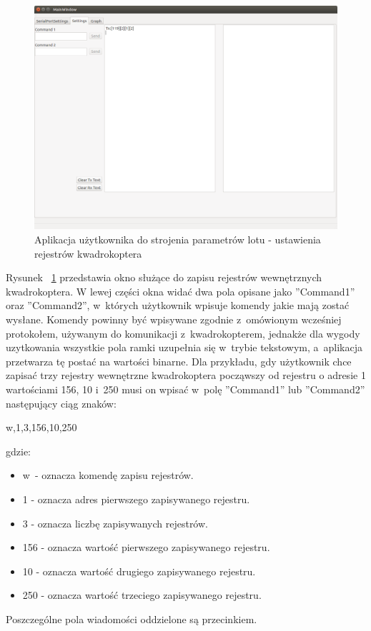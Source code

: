 \documentclass[11pt, twoside]{Thesis} %
\begin{document}
\begin{figure}[H]
	\centering
	\includegraphics[scale=0.4]{Pictures/QuadroTune/QuadroTuneSettings.png}
	\caption[Aplikacja użytkownika do strojenia parametrów lotu - ustawienia rejestrów kwadrokoptera]{Aplikacja użytkownika do strojenia parametrów lotu - ustawienia rejestrów kwadrokoptera}
	\label{fig:QuadroTune_screen2}
\end{figure}

Rysunek ~\ref{fig:QuadroTune_screen2} przedstawia okno służące do zapisu rejestrów wewnętrznych kwadrokoptera. W lewej części okna widać dwa pola opisane jako ''Command1'' oraz ''Command2'', w~których użytkownik wpisuje komendy jakie mają zostać wysłane. Komendy powinny być wpisywane zgodnie z~omówionym wcześniej protokołem, używanym do komunikacji z~kwadrokopterem, jednakże dla wygody uzytkowania wszystkie pola ramki uzupełnia się w~trybie tekstowym, a~aplikacja przetwarza tę postać na wartości binarne. Dla przykładu, gdy użytkownik chce zapisać trzy rejestry wewnętrzne kwadrokoptera począwszy od rejestru o adresie 1 wartościami 156, 10 i~250 musi on wpisać w~polę ''Command1'' lub ''Command2'' następujący ciąg znaków:

w,1,3,156,10,250

gdzie:
\begin{itemize}
	\item w~- oznacza komendę zapisu rejestrów.
	\item 1 - oznacza adres pierwszego zapisywanego rejestru.
	\item 3 - oznacza liczbę zapisywanych rejestrów.
	\item 156 - oznacza wartość pierwszego zapisywanego rejestru.
	\item 10 - oznacza wartość drugiego zapisywanego rejestru.
	\item 250 - oznacza wartość trzeciego zapisywanego rejestru.
\end{itemize}
Poszczególne pola wiadomości oddzielone są przecinkiem.
\end{document}
